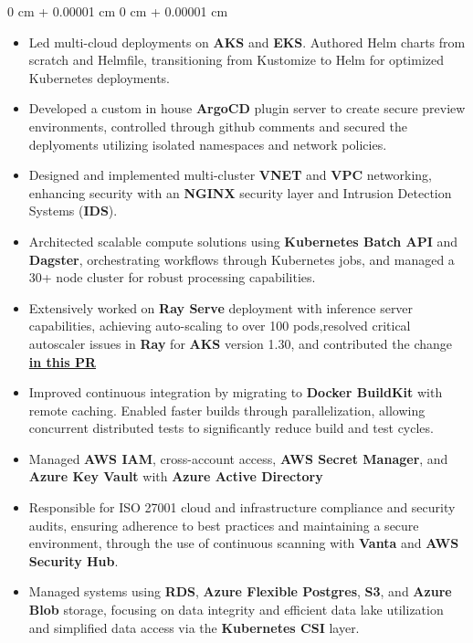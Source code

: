 \documentclass[10pt, letterpaper]{article}
\newenvironment{highlights}{ \begin{itemize}[ topsep=0.10 cm, parsep=0.10 cm, partopsep=0pt,
itemsep=0pt, leftmargin=0 cm + 10pt ] }{ \end{itemize} } %
\newenvironment{onecolentry}{ \begin{adjustwidth}{ 0 cm + 0.00001 cm }{ 0 cm + 0.00001 cm }
}{ \end{adjustwidth} } %
\begin{document}
\vspace{0.10 cm}
\begin{onecolentry}
	\begin{highlights}
		\item Led multi-cloud deployments on \textbf{AKS} and \textbf{EKS}. Authored Helm charts from scratch and Helmfile, transitioning from Kustomize to Helm for optimized Kubernetes deployments.

		\item Developed a custom in house \textbf{ArgoCD} plugin server to create secure preview environments, controlled through github comments and secured the deplyoments utilizing isolated namespaces and network policies.

		\item Designed and implemented multi-cluster \textbf{VNET} and \textbf{VPC} networking, enhancing security with an \textbf{NGINX} security layer and Intrusion Detection Systems (\textbf{IDS}).

		\item Architected scalable compute solutions using \textbf{Kubernetes Batch API} and \textbf{Dagster}, orchestrating workflows through Kubernetes jobs, and managed a 30+ node cluster for robust processing capabilities.

		\item Extensively worked on \textbf{Ray Serve} deployment with inference server capabilities, achieving auto-scaling to over 100 pods,resolved critical autoscaler issues in \textbf{Ray} for \textbf{AKS} version 1.30, and contributed the change \textbf{ \href{https://github.com/ray-project/ray/pull/48481}{in this PR}}

		\item Improved continuous integration by migrating to \textbf{Docker BuildKit} with remote caching. Enabled faster builds through parallelization, allowing concurrent distributed tests to significantly reduce build and test cycles.

		\item Managed \textbf{AWS IAM}, cross-account access, \textbf{AWS Secret Manager}, and \textbf{Azure Key Vault} with \textbf{Azure Active Directory}
		\item Responsible for ISO 27001 cloud and infrastructure compliance and security audits, ensuring adherence to best practices and maintaining a secure environment, through the use of continuous scanning with \textbf{Vanta} and \textbf{AWS Security Hub}.
		\item Managed systems using \textbf{RDS}, \textbf{Azure Flexible Postgres}, \textbf{S3}, and \textbf{Azure Blob} storage, focusing on data integrity and efficient data lake utilization and simplified data access via the \textbf{Kubernetes CSI} layer.


\end{highlights}
\end{onecolentry}
\end{document}
